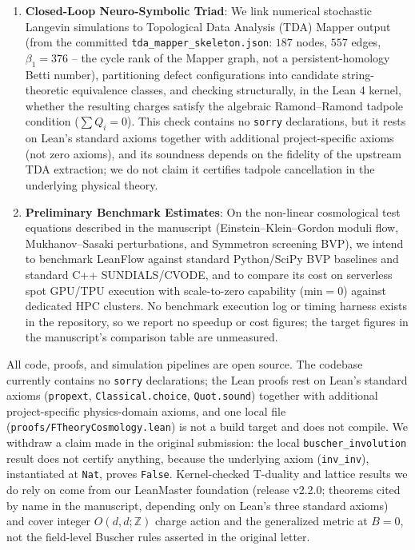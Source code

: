 \documentclass[11pt]{letter}
\providecommand{\numreconcile}[2]{#1}
\begin{document}
\begin{enumerate}
    \item \textbf{Closed-Loop Neuro-Symbolic Triad}: We link numerical stochastic Langevin simulations to Topological Data Analysis (TDA) Mapper output (from the committed \texttt{tda\_mapper\_skeleton.json}: $\numreconcile{187}{TDA nodes}$ nodes, $\numreconcile{557}{TDA edges}$ edges, $\beta_1 = \numreconcile{376}{TDA beta 1}$ -- the cycle rank of the Mapper graph, not a persistent-homology Betti number), partitioning defect configurations into candidate string-theoretic equivalence classes, and checking structurally, in the Lean 4 kernel, whether the resulting charges satisfy the algebraic Ramond--Ramond tadpole condition ($\sum Q_i = 0$). This check contains no \texttt{sorry} declarations, but it rests on Lean's standard axioms together with additional project-specific axioms (not zero axioms), and its soundness depends on the fidelity of the upstream TDA extraction; we do not claim it certifies tadpole cancellation in the underlying physical theory.

    \item \textbf{Preliminary Benchmark Estimates}: On the non-linear cosmological test equations described in the manuscript (Einstein--Klein--Gordon moduli flow, Mukhanov--Sasaki perturbations, and Symmetron screening BVP), we intend to benchmark LeanFlow against standard Python/SciPy BVP baselines and standard C++ SUNDIALS/CVODE, and to compare its cost on serverless spot GPU/TPU execution with scale-to-zero capability ($\text{min}=0$) against dedicated HPC clusters. No benchmark execution log or timing harness exists in the repository, so we report no speedup or cost figures; the target figures in the manuscript's comparison table are unmeasured.
\end{enumerate}

All code, proofs, and simulation pipelines are open source. The codebase currently contains no \texttt{sorry} declarations; the Lean proofs rest on Lean's standard axioms (\texttt{propext}, \texttt{Classical.choice}, \texttt{Quot.sound}) together with additional project-specific physics-domain axioms, and one local file (\texttt{proofs/FTheoryCosmology.lean}) is not a build target and does not compile. We withdraw a claim made in the original submission: the local \texttt{buscher\_involution} result does not certify anything, because the underlying axiom (\texttt{inv\_inv}), instantiated at \texttt{Nat}, proves \texttt{False}. Kernel-checked T-duality and lattice results we do rely on come from our LeanMaster foundation (release v2.2.0; theorems cited by name in the manuscript, depending only on Lean's three standard axioms) and cover integer $O(d,d;\mathbb{Z})$ charge action and the generalized metric at $B=0$, not the field-level Buscher rules asserted in the original letter.
\end{document}
